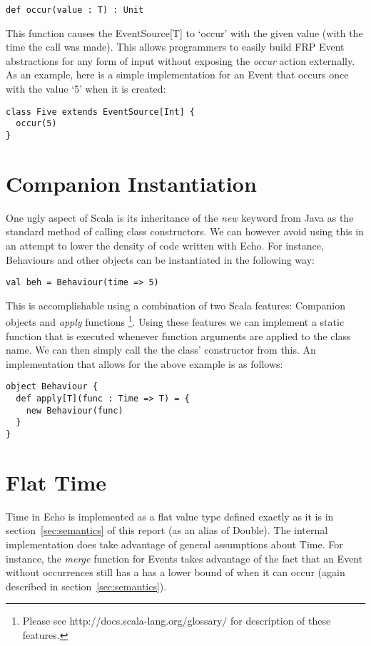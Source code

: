 \begin{verbatim}
def occur(value : T) : Unit
\end{verbatim}  

    This function causes the EventSource[T] to `occur' with the given value (with the time the call was made). This allows 
    programmers
    to easily build FRP Event abstractions for any form of input without exposing the \emph{occur} action externally.
    As an example, here is a simple implementation for an Event that occurs once with the value `5' when it 
    is created:
    
\begin{verbatim}
class Five extends EventSource[Int] {
  occur(5)
}
\end{verbatim}

  \section{Companion Instantiation}
    One ugly aspect of Scala is its inheritance of the \emph{new} keyword from Java as the standard
    method of calling class constructors.
    We can however avoid using this in an attempt to lower the density of code written with Echo. For instance, Behaviours and other objects can be instantiated in the following way:

\begin{verbatim}
val beh = Behaviour(time => 5)
\end{verbatim}

    This is accomplishable using a combination of two Scala features: Companion objects and \emph{apply} functions
    \footnote{Please see http://docs.scala-lang.org/glossary/ for description of these features.}. Using these features we can implement a static function that is executed whenever function
    arguments are applied to the class name. We can then simply call the the class' constructor from this. An implementation
    that allows for the above example is as follows:

\begin{verbatim}
object Behaviour {
  def apply[T](func : Time => T) = {
    new Behaviour(func)
  }
}
\end{verbatim}
    
  \section{Flat Time}
    Time in Echo is implemented as a flat value type defined exactly as it is in 
    section~\ref{sec:semantics} of this report (as an alias of Double). The internal implementation does take advantage
    of general assumptions about Time. For instance, the \emph{merge} function for Events takes advantage
    of the fact that an Event without occurrences still has a has a lower bound of when it can occur (again described
    in section~\ref{sec:semantics}). 
    
